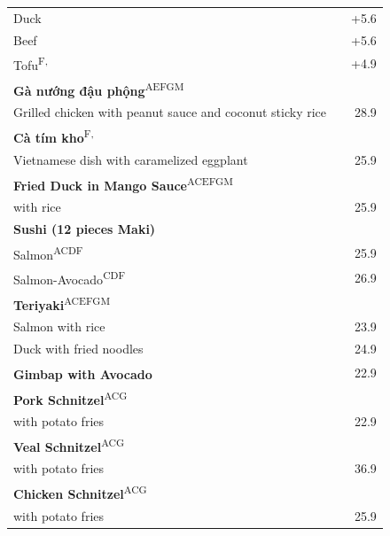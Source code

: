 \documentclass[a4paper,12pt]{article}
\newcommand{\vegan}{\textbf{\scriptsize \color{vegan}{Vegan}}}
\begin{document}
\begin{multicols}{2}
\begin{tabular}{Lrr}
\hspace{0.4cm}Duck & & +5.6\\
\hspace{0.4cm}Beef & & +5.6\\
\hspace{0.4cm}Tofu\textsuperscript{{\scriptsize F, \vegan}} & & +4.9\\
\textbf{Gà nướng đậu phộng}\textsuperscript{{\scriptsize AEFGM}}\\
\hspace{0.4cm}\scriptsize Grilled chicken with peanut sauce and coconut sticky rice & & 28.9\\
\textbf{Cà tím kho}\textsuperscript{{\scriptsize F, \vegan}}\\
\hspace{0.4cm}\scriptsize Vietnamese dish with caramelized eggplant & & 25.9\\
\textbf{Fried Duck in Mango Sauce}\textsuperscript{{\scriptsize ACEFGM}}\\
\hspace{0.4cm}\scriptsize with rice & & 25.9\\
\textbf{Sushi (12 pieces Maki)}\\
\hspace{0.4cm}Salmon\textsuperscript{{\scriptsize ACDF}} & & 25.9\\
\hspace{0.4cm}Salmon-Avocado\textsuperscript{{\scriptsize CDF}} & & 26.9\\
\textbf{Teriyaki}\textsuperscript{{\scriptsize ACEFGM}}\\
\hspace{0.4cm}Salmon with rice & & 23.9\\
\hspace{0.4cm}Duck with fried noodles & & 24.9\\
\textbf{Gimbap with Avocado}\textsuperscript{{\scriptsize \vegan}} & & 22.9\\
\textbf{Pork Schnitzel}\textsuperscript{{\scriptsize ACG}}\\
\hspace{0.4cm}\scriptsize with potato fries & & 22.9\\
\textbf{Veal Schnitzel}\textsuperscript{{\scriptsize ACG}}\\
\hspace{0.4cm}\scriptsize with potato fries & & 36.9\\
\textbf{Chicken Schnitzel}\textsuperscript{{\scriptsize ACG}}\\
\hspace{0.4cm}\scriptsize with potato fries & & 25.9
\end{tabular}

\end{multicols}
\end{document}
